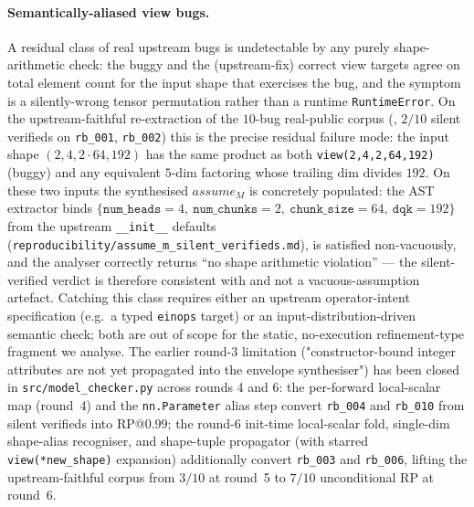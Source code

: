 \paragraph{Semantically-aliased view bugs.}
A residual class of real upstream bugs is undetectable by any
purely shape-arithmetic check: the buggy and the (upstream-fix)
correct view targets agree on total element count for the
input shape that exercises the bug, and the symptom is a
silently-wrong tensor permutation rather than a runtime
\texttt{RuntimeError}.  On the upstream-faithful re-extraction of
the $10$-bug real-public corpus (,
$2/10$ silent verifieds on \texttt{rb\_001}, \texttt{rb\_002})
this is the precise residual failure mode: the input shape
$(2, 4, 2{\cdot}64, 192)$ has the same product as both
\texttt{view(2,4,2,64,192)} (buggy) and any equivalent
$5$-dim factoring whose trailing dim divides $192$.  On these two
inputs the synthesised $\mathit{assume}_M$ is concretely populated:
the AST extractor binds
$\{\texttt{num\_heads}{=}4,\ \texttt{num\_chunks}{=}2,
  \ \texttt{chunk\_size}{=}64,\ \texttt{dqk}{=}192\}$ from the
upstream \texttt{\_\_init\_\_} defaults
(\texttt{reproducibility/assume\_m\_silent\_verifieds.md}),
 is satisfied non-vacuously, and the analyser
correctly returns ``no shape arithmetic violation'' --- the
silent-verified verdict is therefore consistent with
 and not a vacuous-assumption artefact.
Catching this class requires either an upstream operator-intent
specification (e.g.\ a typed \texttt{einops} target) or an
input-distribution-driven semantic check; both are out of
scope for the static, no-execution refinement-type fragment we
analyse.  The earlier round-3 limitation
("constructor-bound integer attributes are not yet propagated
into the envelope synthesiser") has been closed in
\texttt{src/model\_checker.py} across rounds 4 and 6: the
per-forward local-scalar map (round~4) and the
\texttt{nn.Parameter} alias step convert
\texttt{rb\_004} and \texttt{rb\_010} from silent
verifieds into RP@$0.99$; the round-6 init-time local-scalar
fold, single-dim shape-alias recogniser, and shape-tuple
propagator (with starred \texttt{view(*new\_shape)}
expansion) additionally convert \texttt{rb\_003} and
\texttt{rb\_006}, lifting the upstream-faithful corpus from
$3/10$ at round~5 to $7/10$ unconditional RP at round~6.

